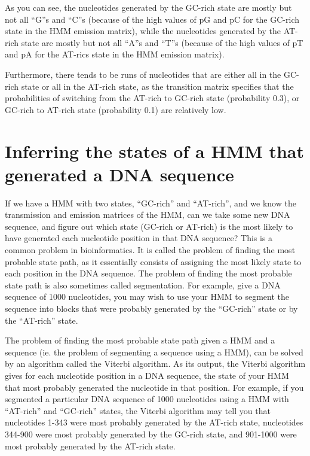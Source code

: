 \documentclass[
]{book}
\begin{document}
As you can see, the nucleotides generated by the GC-rich state are mostly but not all ``G''s and ``C''s (because of the high values of pG and pC for the GC-rich state in the HMM emission matrix), while the nucleotides generated by the AT-rich state are mostly but not all ``A''s and ``T''s (because of the high values of pT and pA for the AT-rics state in the HMM emission matrix).

Furthermore, there tends to be runs of nucleotides that are either all in the GC-rich state or all in the AT-rich state, as the transition matrix specifies that the probabilities of switching from the AT-rich to GC-rich state (probability 0.3), or GC-rich to AT-rich state (probability 0.1) are relatively low.

\hypertarget{inferring-the-states-of-a-hmm-that-generated-a-dna-sequence}{%
\section{Inferring the states of a HMM that generated a DNA sequence}\label{inferring-the-states-of-a-hmm-that-generated-a-dna-sequence}}

If we have a HMM with two states, ``GC-rich'' and ``AT-rich'', and we know the transmission and emission matrices of the HMM, can we take some new DNA sequence, and figure out which state (GC-rich or AT-rich) is the most likely to have generated each nucleotide position in that DNA sequence? This is a common problem in bioinformatics. It is called the problem of finding the most probable state path, as it essentially consists of assigning the most likely state to each position in the DNA sequence. The problem of finding the most probable state path is also sometimes called segmentation. For example, give a DNA sequence of 1000 nucleotides, you may wish to use your HMM to segment the sequence into blocks that were probably generated by the ``GC-rich'' state or by the ``AT-rich'' state.

The problem of finding the most probable state path given a HMM and a sequence (ie. the problem of segmenting a sequence using a HMM), can be solved by an algorithm called the Viterbi algorithm. As its output, the Viterbi algorithm gives for each nucleotide position in a DNA sequence, the state of your HMM that most probably generated the nucleotide in that position. For example, if you segmented a particular DNA sequence of 1000 nucleotides using a HMM with ``AT-rich'' and ``GC-rich'' states, the Viterbi algorithm may tell you that nucleotides 1-343 were most probably generated by the AT-rich state, nucleotides 344-900 were most probably generated by the GC-rich state, and 901-1000 were most probably generated by the AT-rich state.
\end{document}
